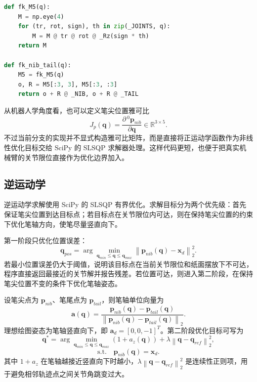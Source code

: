 \documentclass[UTF8,a4paper,12pt]{ctexart}
\begin{document}
\begin{lstlisting}[language=Python, caption={五自由度机械臂正运动学}]
def fk_M5(q):
    M = np.eye(4)
    for (tr, rot, sign), th in zip(_JOINTS, q):
        M = M @ tr @ rot @ _Rz(sign * th)
    return M

def fk_nib_tail(q):
    M5 = fk_M5(q)
    o, R = M5[:3, 3], M5[:3, :3]
    return o + R @ _NIB, o + R @ _TAIL
\end{lstlisting}

从机器人学角度看，也可以定义笔尖位置雅可比
\[
  J_p(\mathbf{q})=
  \frac{\partial\,{}^{0}\mathbf{p}_{nib}}{\partial \mathbf{q}}
  \in \mathbb{R}^{3\times 5}.
\]
不过当前分支的实现并不显式构造雅可比矩阵，而是直接将正运动学函数作为非线性优化目标交给 SciPy 的 SLSQP 求解器处理。这样代码更短，也便于把真实机械臂的关节限位直接作为优化边界加入。

\subsection{逆运动学}

逆运动学求解使用 SciPy 的 SLSQP 有界优化。求解目标分为两个优先级：首先保证笔尖位置到达目标点；若目标点在关节限位内可达，则在保持笔尖位置的约束下优化笔轴方向，使笔尽量竖直向下。

第一阶段只优化位置误差：
\[
  \mathbf{q}_{pos} =
  \arg\min_{\mathbf{q}_{min}\le \mathbf{q}\le \mathbf{q}_{max}}
  \left\| \mathbf{p}_{nib}(\mathbf{q})-\mathbf{x}_d \right\|_2^2 .
\]
若最小位置误差仍大于阈值，说明该目标点在当前关节限位和纸面摆放下不可达，程序直接返回最接近的关节解并报告残差。若位置可达，则进入第二阶段，在保持笔尖位置不变的条件下优化笔轴姿态。

设笔尖点为 $\mathbf{p}_{nib}$、笔尾点为 $\mathbf{p}_{tail}$，则笔轴单位向量为
\[
  \mathbf{a}(\mathbf{q})=
  \frac{\mathbf{p}_{nib}(\mathbf{q})-\mathbf{p}_{tail}(\mathbf{q})}
       {\left\|\mathbf{p}_{nib}(\mathbf{q})-\mathbf{p}_{tail}(\mathbf{q})\right\|_2}.
\]
理想绘图姿态为笔轴竖直向下，即 $\mathbf{a}_d=[0,0,-1]^T$。第二阶段优化目标可写为
\[
  \mathbf{q}^{*} =
  \arg\min_{\mathbf{q}_{min}\le \mathbf{q}\le \mathbf{q}_{max}}
  \left(1+a_z(\mathbf{q})\right)
  + \lambda \left\|\mathbf{q}-\mathbf{q}_{ref}\right\|_2^2,
\]
\[
  \mathrm{s.t.}\quad
  \mathbf{p}_{nib}(\mathbf{q})=\mathbf{x}_d .
\]
其中 $1+a_z$ 在笔轴越接近竖直向下时越小，$\lambda \left\|\mathbf{q}-\mathbf{q}_{ref}\right\|_2^2$ 是连续性正则项，用于避免相邻轨迹点之间关节角跳变过大。
\end{document}
